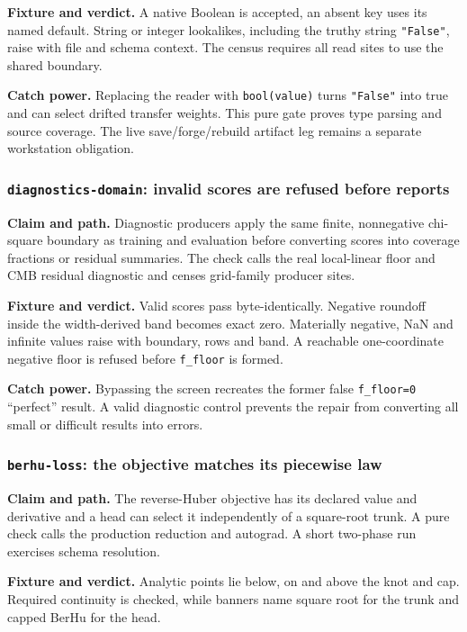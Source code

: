 \documentclass[10pt,aps,prd,twocolumn,nofootinbib]{revtex4-2}
\newcommand{\code}[1]{\texttt{#1}}
\begin{document}
\textbf{Fixture and verdict.}  A native Boolean is accepted, an absent key
uses its named default.  String or integer lookalikes, including the
truthy string \code{"False"}, raise with file and schema context.  The
census requires all read sites to use the shared boundary.

\textbf{Catch power.}  Replacing the reader with \code{bool(value)} turns
\code{"False"} into true and can select drifted transfer weights.  This
pure gate proves type parsing and source coverage.  The live save/forge/rebuild
artifact leg remains a separate workstation obligation.

\subsubsection{\code{diagnostics-domain}: invalid scores are refused before reports}

\textbf{Claim and path.}  Diagnostic producers apply the same finite,
nonnegative chi-square boundary as training and evaluation before converting
scores into coverage fractions or residual summaries.  The check calls the
real local-linear floor and CMB residual diagnostic and censes grid-family
producer sites.

\textbf{Fixture and verdict.}  Valid scores pass byte-identically.  Negative
roundoff inside the width-derived band becomes exact zero.  Materially negative,
NaN and infinite values raise with boundary, rows and band.  A reachable
one-coordinate negative floor is refused before \code{f\_floor} is formed.

\textbf{Catch power.}  Bypassing the screen recreates the former false
\code{f\_floor=0} ``perfect'' result.  A valid diagnostic control prevents the
repair from converting all small or difficult results into errors.

\subsubsection{\code{berhu-loss}: the objective matches its piecewise law}

\textbf{Claim and path.}  The reverse-Huber objective has its declared value
and derivative and a head can select it independently of a square-root
trunk.  A pure check calls the production reduction and autograd.  A short
two-phase run exercises schema resolution.

\textbf{Fixture and verdict.}  Analytic points lie below, on and above the
knot and cap.  Required continuity is checked, while banners name square root
for the trunk and capped BerHu for the head.
\end{document}
